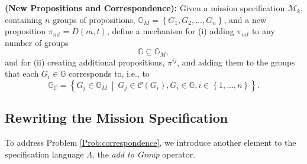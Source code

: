 \begin{myProblem}\label{Prob:correspondence} %
	\textbf{(New Propositions and Correspondence):} Given a mission specification $\mathcal{M}_k$, containing $n$ groups of propositions, $\mathbb{G}_M = \left\{ G_1, G_2, \ldots, G_n \right\}$, and a new proposition $\pi_{mt} = D(m, t)$, define a mechanism for (i) adding $\pi_{mt}$ to any number of groups
	$$ \mathbb{G} \subseteq \mathbb{G}_M,$$
	and for (ii) creating additional propositions, $\pi^{ij}$, and adding them to the groups that each $G_i \in \mathbb{G}$ corresponds to, i.e., to
	$$ \mathbb{G}_\mathcal{C} = \left\{ G_j \in \mathbb{G}_M \: \middle| \: G_j \in \mathcal{C}(G_i), G_i \in \mathbb{G}, i \in \left\{ 1, \ldots, n \right\} \right\}.$$
\end{myProblem}

\subsection{Rewriting the Mission Specification}\label{rewriting}

To address Problem \ref{Prob:correspondence}, we introduce another element to the specification language $\Lambda$, the \emph{add to Group} operator.

